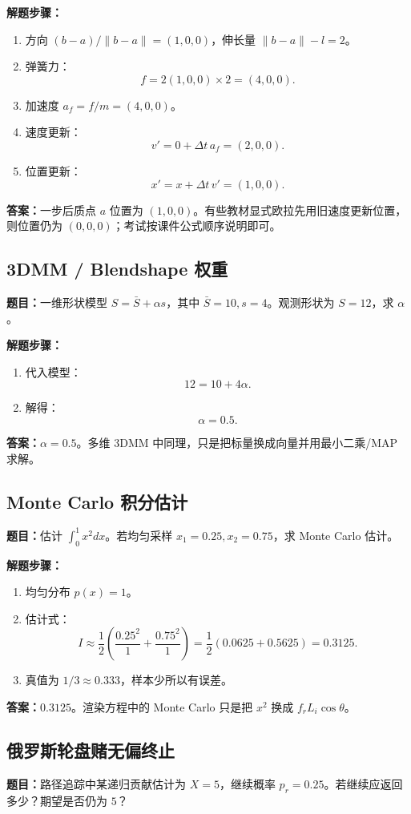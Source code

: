 \documentclass[UTF8,zihao=-4,scheme=chinese,fontset=fandol]{ctexart}
\begin{document}
\textbf{解题步骤：}
\begin{enumerate}
  \item 方向 $(b-a)/\|b-a\|=(1,0,0)$，伸长量 $\|b-a\|-l=2$。
  \item 弹簧力：
  \[
  f=2(1,0,0)\times2=(4,0,0).
  \]
  \item 加速度 $a_f=f/m=(4,0,0)$。
  \item 速度更新：
  \[
  v'=0+\Delta t\,a_f=(2,0,0).
  \]
  \item 位置更新：
  \[
  x'=x+\Delta t\,v'=(1,0,0).
  \]
\end{enumerate}
\textbf{答案：}一步后质点 $a$ 位置为 $(1,0,0)$。有些教材显式欧拉先用旧速度更新位置，则位置仍为 $(0,0,0)$；考试按课件公式顺序说明即可。

\subsection{3DMM / Blendshape 权重}
\textbf{题目：}一维形状模型 $S=\bar S+\alpha s$，其中 $\bar S=10,s=4$。观测形状为 $S=12$，求 $\alpha$。

\textbf{解题步骤：}
\begin{enumerate}
  \item 代入模型：
  \[
  12=10+4\alpha.
  \]
  \item 解得：
  \[
  \alpha=0.5.
  \]
\end{enumerate}
\textbf{答案：}$\alpha=0.5$。多维 3DMM 中同理，只是把标量换成向量并用最小二乘/MAP 求解。

\subsection{Monte Carlo 积分估计}
\textbf{题目：}估计 $\int_0^1 x^2dx$。若均匀采样 $x_1=0.25,x_2=0.75$，求 Monte Carlo 估计。

\textbf{解题步骤：}
\begin{enumerate}
  \item 均匀分布 $p(x)=1$。
  \item 估计式：
  \[
  I\approx\frac12\left(\frac{0.25^2}{1}+\frac{0.75^2}{1}\right)
  =\frac12(0.0625+0.5625)=0.3125.
  \]
  \item 真值为 $1/3\approx0.333$，样本少所以有误差。
\end{enumerate}
\textbf{答案：}$0.3125$。渲染方程中的 Monte Carlo 只是把 $x^2$ 换成 $f_rL_i\cos\theta$。

\subsection{俄罗斯轮盘赌无偏终止}
\textbf{题目：}路径追踪中某递归贡献估计为 $X=5$，继续概率 $p_r=0.25$。若继续应返回多少？期望是否仍为 $5$？
\end{document}
